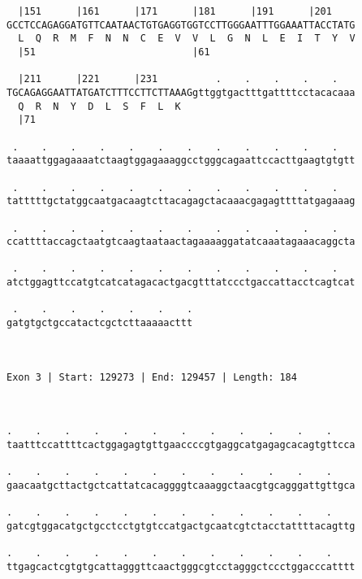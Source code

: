 \documentclass{article}
\begin{document}
\begin{Verbatim}
  |151      |161      |171      |181      |191      |201    
GCCTCCAGAGGATGTTCAATAACTGTGAGGTGGTCCTTGGGAATTTGGAAATTACCTATG
  L  Q  R  M  F  N  N  C  E  V  V  L  G  N  L  E  I  T  Y  V
  |51                           |61                         
  
  |211      |221      |231          .    .    .    .    .   
TGCAGAGGAATTATGATCTTTCCTTCTTAAAGgttggtgactttgattttcctacacaaa
  Q  R  N  Y  D  L  S  F  L  K                              
  |71                                                       
  
 .    .    .    .    .    .    .    .    .    .    .    .   
taaaattggagaaaatctaagtggagaaaggcctgggcagaattccacttgaagtgtgtt
                                                            
 .    .    .    .    .    .    .    .    .    .    .    .   
tatttttgctatggcaatgacaagtcttacagagctacaaacgagagttttatgagaaag
                                                            
 .    .    .    .    .    .    .    .    .    .    .    .   
ccattttaccagctaatgtcaagtaataactagaaaaggatatcaaatagaaacaggcta
                                                            
 .    .    .    .    .    .    .    .    .    .    .    .   
atctggagttccatgtcatcatagacactgacgtttatccctgaccattacctcagtcat
                                                            
 .    .    .    .    .    .    .
gatgtgctgccatactcgctcttaaaaacttt
                                
                                
 
Exon 3 | Start: 129273 | End: 129457 | Length: 184



.    .    .    .    .    .    .    .    .    .    .    .    
taatttccattttcactggagagtgttgaaccccgtgaggcatgagagcacagtgttcca
                                                            
.    .    .    .    .    .    .    .    .    .    .    .    
gaacaatgcttactgctcattatcacaggggtcaaaggctaacgtgcagggattgttgca
                                                            
.    .    .    .    .    .    .    .    .    .    .    .    
gatcgtggacatgctgcctcctgtgtccatgactgcaatcgtctacctattttacagttg
                                                            
.    .    .    .    .    .    .    .    .    .    .    .    
ttgagcactcgtgtgcattagggttcaactgggcgtcctagggctccctggacccatttt
                                                            

\end{Verbatim}
\end{document}

